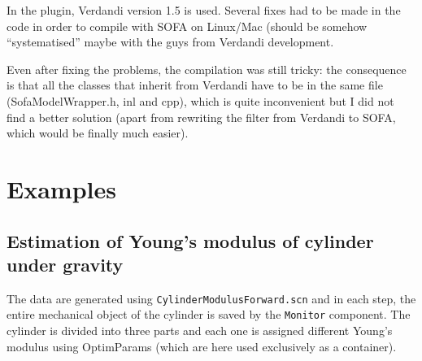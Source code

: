 \documentclass[10pt]{article}
\begin{document}
In the plugin, Verdandi version 1.5 is used. Several fixes had to be made in the code in order to compile with SOFA on Linux/Mac (should be somehow
``systematised'' maybe with the guys from Verdandi development.

Even after fixing the problems, the compilation was still tricky: the consequence is that all the classes that inherit from Verdandi have to be in the
same file (SofaModelWrapper.h, inl and cpp), which is quite inconvenient but I did not find a better solution (apart from rewriting the filter from
Verdandi to SOFA, which would be finally much easier). 





\section{Examples}

\subsection{Estimation of Young's modulus of cylinder under gravity}

The data are generated using \texttt{CylinderModulusForward.scn} and in each step, the entire mechanical object of the cylinder is saved by the
\texttt{Monitor} component.
The cylinder is divided into three parts and each one is assigned different Young's modulus using OptimParams  (which are here used exclusively as a
container).
\end{document}
